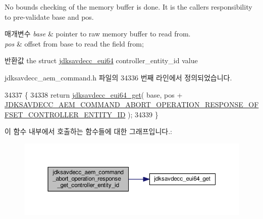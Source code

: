 No bounds checking of the memory buffer is done. It is the caller\textquotesingle{}s responsibility to pre-\/validate base and pos.


\begin{DoxyParams}{매개변수}
{\em base} & pointer to raw memory buffer to read from. \\
\hline
{\em pos} & offset from base to read the field from; \\
\hline
\end{DoxyParams}
\begin{DoxyReturn}{반환값}
the struct \hyperlink{structjdksavdecc__eui64}{jdksavdecc\+\_\+eui64} controller\+\_\+entity\+\_\+id value 
\end{DoxyReturn}


jdksavdecc\+\_\+aem\+\_\+command.\+h 파일의 34336 번째 라인에서 정의되었습니다.


\begin{DoxyCode}
34337 \{
34338     \textcolor{keywordflow}{return} \hyperlink{group__eui64_ga2652311a25a6b91cddbed75c108c7031}{jdksavdecc\_eui64\_get}( base, pos + 
      \hyperlink{group__command__abort__operation__response_ga38858b7d1e5c984a6965723b3f6dd107}{JDKSAVDECC\_AEM\_COMMAND\_ABORT\_OPERATION\_RESPONSE\_OFFSET\_CONTROLLER\_ENTITY\_ID}
       );
34339 \}
\end{DoxyCode}


이 함수 내부에서 호출하는 함수들에 대한 그래프입니다.\+:
\nopagebreak
\begin{figure}[H]
\begin{center}
\leavevmode
\includegraphics[width=350pt]{group__command__abort__operation__response_ga858ac1ba856c63dfc52fb67af588eb07_cgraph}
\end{center}
\end{figure}



